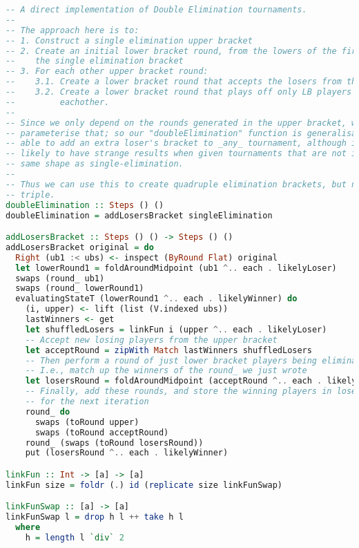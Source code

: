 \documentclass[a4,11pt,twoside,final,hidelinks]{article}
\begin{document}
\begin{lstlisting}[language=haskell,numbers=none,basicstyle=\ttfamily\small]
-- A direct implementation of Double Elimination tournaments.
--
-- The approach here is to:
-- 1. Construct a single elimination upper bracket
-- 2. Create an initial lower bracket round, from the lowers of the first round of
--    the single elimination bracket
-- 3. For each other upper bracket round:
--    3.1. Create a lower bracket round that accepts the losers from that round
--    3.2. Create a lower bracket round that plays off only LB players against
--         eachother.
--
-- Since we only depend on the rounds generated in the upper bracket, we can
-- parameterise that; so our "doubleElimination" function is generalisable to be
-- able to add an extra loser's bracket to _any_ tournament, although it is
-- likely to have strange results when given tournaments that are not in the
-- same shape as single-elimination.
--
-- Thus we can use this to create quadruple elimination brackets, but not
-- triple.
doubleElimination :: Steps () ()
doubleElimination = addLosersBracket singleElimination

addLosersBracket :: Steps () () -> Steps () ()
addLosersBracket original = do
  Right (ub1 :< ubs) <- inspect (ByRound Flat) original
  let lowerRound1 = foldAroundMidpoint (ub1 ^.. each . likelyLoser)
  swaps (round_ ub1)
  swaps (round_ lowerRound1)
  evaluatingStateT (lowerRound1 ^.. each . likelyWinner) do
    (i, upper) <- lift (list (V.indexed ubs))
    lastWinners <- get
    let shuffledLosers = linkFun i (upper ^.. each . likelyLoser)
    -- Accept new losing players from the upper bracket
    let acceptRound = zipWith Match lastWinners shuffledLosers
    -- Then perform a round of just lower bracket players being eliminated
    -- I.e., match up the winners of the round_ we just wrote
    let losersRound = foldAroundMidpoint (acceptRound ^.. each . likelyWinner)
    -- Finally, add these rounds, and store the winning players in losersRound
    -- for the next iteration
    round_ do
      swaps (toRound upper)
      swaps (toRound acceptRound)
    round_ (swaps (toRound losersRound))
    put (losersRound ^.. each . likelyWinner)

linkFun :: Int -> [a] -> [a]
linkFun size = foldr (.) id (replicate size linkFunSwap)

linkFunSwap :: [a] -> [a]
linkFunSwap l = drop h l ++ take h l
  where
    h = length l `div` 2
\end{lstlisting}

\newpage
\end{document}
